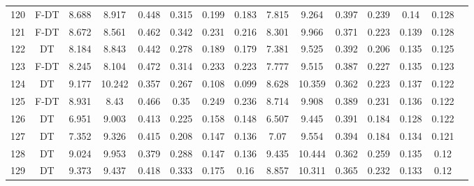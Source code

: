 \begin{longtable}{@{\hskip3pt}c@{\hskip3pt}c@{\hskip3pt}c@{\hskip3pt}c@{\hskip3pt}c@{\hskip3pt}c@{\hskip3pt}c@{\hskip3pt}c@{\hskip3pt}c@{\hskip3pt}c@{\hskip3pt}c@{\hskip3pt}c@{\hskip3pt}c@{\hskip3pt}c@{\hskip3pt}c}
        120 &           F-DT &             8.688 &       8.917 &           0.448 &           0.315 &           0.199 &           0.183 &               7.815 &       9.264 &           0.397 &         0.239 &           0.14 &           0.128 \\
        121 &           F-DT &             8.672 &       8.561 &           0.462 &           0.342 &           0.231 &           0.216 &               8.301 &       9.966 &           0.371 &         0.223 &          0.139 &           0.128 \\
        122 &             DT &             8.184 &       8.843 &           0.442 &           0.278 &           0.189 &           0.179 &               7.381 &       9.525 &           0.392 &         0.206 &          0.135 &           0.125 \\
        123 &           F-DT &             8.245 &       8.104 &           0.472 &           0.314 &           0.233 &           0.223 &               7.777 &       9.515 &           0.387 &         0.227 &          0.135 &           0.123 \\
        124 &             DT &             9.177 &      10.242 &           0.357 &           0.267 &           0.108 &           0.099 &               8.628 &      10.359 &           0.362 &         0.223 &          0.137 &           0.122 \\
        125 &           F-DT &             8.931 &        8.43 &           0.466 &            0.35 &           0.249 &           0.236 &               8.714 &       9.908 &           0.389 &         0.231 &          0.136 &           0.122 \\
        126 &             DT &             6.951 &       9.003 &           0.413 &           0.225 &           0.158 &           0.148 &               6.507 &       9.445 &           0.391 &         0.184 &          0.128 &           0.122 \\
        127 &             DT &             7.352 &       9.326 &           0.415 &           0.208 &           0.147 &           0.136 &                7.07 &       9.554 &           0.394 &         0.184 &          0.134 &           0.121 \\
        128 &             DT &             9.024 &       9.953 &           0.379 &           0.288 &           0.147 &           0.136 &               9.435 &      10.444 &           0.362 &         0.259 &          0.135 &            0.12 \\
        129 &             DT &             9.373 &       9.437 &           0.418 &           0.333 &           0.175 &            0.16 &               8.857 &      10.311 &           0.365 &         0.232 &          0.133 &            0.12 \\

\end{longtable}
